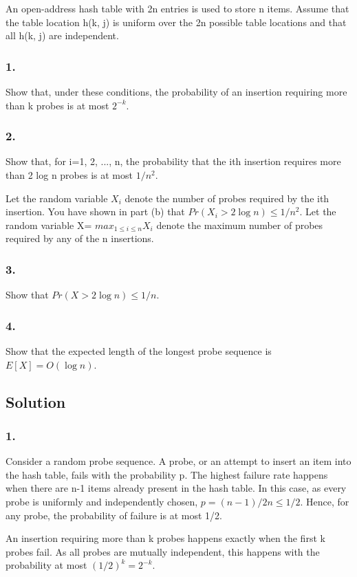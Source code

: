 \documentclass[10pt]{article}
\begin{document}
An open-address hash table with 2n entries is used to store n items. Assume that the table location h(k, j) is uniform over the 2n possible table locations and that all h(k, j) are independent.

\subsubsection{1.} Show that, under these conditions, the probability of an insertion requiring more than k probes is at most $2^{-k}$.

\subsubsection{2.} Show that, for i=1, 2, ..., n, the probability that the ith insertion requires more than 2 log n probes is at most $1/n^{2}$.

Let the random variable $X_{i}$ denote the number of probes required by the ith insertion. You have shown in part (b) that $Pr(X_{i}>2 \log n)\leq 1/n^{2}$. Let the random variable X= $max_{1\leq i \leq n} X_{i}$ denote the maximum number of probes required by any of the n insertions.

\subsubsection{3.} Show that $Pr(X>2 \log n)\leq 1/n$.
\subsubsection{4.} Show that the expected length of the longest probe sequence is $E[X]=O(\log n)$.

\subsection{Solution}

\subsubsection{1.} Consider a random probe sequence. A probe, or an attempt to insert an item into the hash table, fails with the probability p. The highest failure rate happens when there are n-1 items already present in the hash table. In this case, as every probe is uniformly and independently chosen, $p = (n-1)/2n \leq 1/2$. Hence, for any probe, the probability of failure is at most 1/2.

An insertion requiring more than k probes happens exactly when the first k probes fail. As all probes are mutually independent, this happens with the probability at most $(1/2)^{k}=2^{-k}$.
\end{document}
